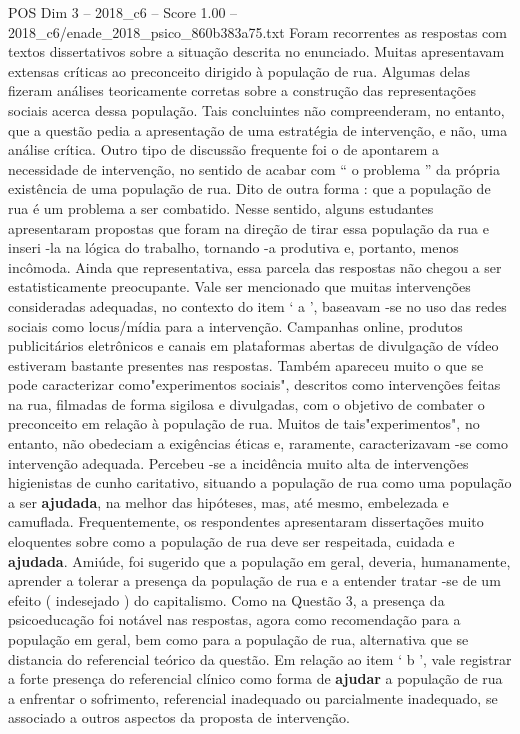 \begin{textsample}{POS Dim 3 – 2018\_c6 – Score 1.00 – 2018\_c6/enade\_2018\_psico\_860b383a75.txt}
Foram recorrentes as respostas com textos dissertativos sobre a situação descrita no enunciado.
Muitas apresentavam extensas críticas ao preconceito dirigido à população de rua.
Algumas delas fizeram análises teoricamente corretas sobre a construção das representações sociais acerca dessa população.
Tais concluintes não compreenderam, no entanto, que a questão pedia a apresentação de uma estratégia de intervenção, e não, uma análise crítica.
Outro tipo de discussão frequente foi o de apontarem a necessidade de intervenção, no sentido de acabar com “ o problema ” da própria existência de uma população de rua.
Dito de outra forma : que a população de rua é um problema a ser combatido.
Nesse sentido, alguns estudantes apresentaram propostas que foram na direção de tirar essa população da rua e inseri -la na lógica do trabalho, tornando -a produtiva e, portanto, menos incômoda.
Ainda que representativa, essa parcela das respostas não chegou a ser estatisticamente preocupante.
Vale ser mencionado que muitas intervenções consideradas adequadas, no contexto do item ‘ a ’, baseavam -se no uso das redes sociais como locus/mídia para a intervenção.
Campanhas online, produtos publicitários eletrônicos e canais em plataformas abertas de divulgação de vídeo estiveram bastante presentes nas respostas.
Também apareceu muito o que se pode caracterizar como"experimentos sociais", descritos como intervenções feitas na rua, filmadas de forma sigilosa e divulgadas, com o objetivo de combater o preconceito em relação à população de rua.
Muitos de tais"experimentos", no entanto, não obedeciam a exigências éticas e, raramente, caracterizavam -se como intervenção adequada.
Percebeu -se a incidência muito alta de intervenções higienistas de cunho caritativo, situando a população de rua como uma população a ser \textbf{ajudada}, na melhor das hipóteses, mas, até mesmo, embelezada e camuflada.
Frequentemente, os respondentes apresentaram dissertações muito eloquentes sobre como a população de rua deve ser respeitada, cuidada e \textbf{ajudada}.
Amiúde, foi sugerido que a população em geral, deveria, humanamente, aprender a tolerar a presença da população de rua e a entender tratar -se de um efeito ( indesejado ) do capitalismo.
Como na Questão 3, a presença da psicoeducação foi notável nas respostas, agora como recomendação para a população em geral, bem como para a população de rua, alternativa que se distancia do referencial teórico da questão.
Em relação ao item ‘ b ’, vale registrar a forte presença do referencial clínico como forma de \textbf{ajudar} a população de rua a enfrentar o sofrimento, referencial inadequado ou parcialmente inadequado, se associado a outros aspectos da proposta de intervenção.

\end{textsample}
